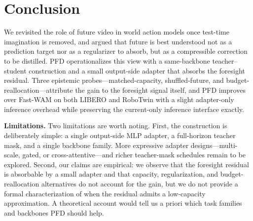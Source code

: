 \documentclass{article}
\begin{document}

\section{Conclusion}
\label{sec:conclusion}

We revisited the role of future video in world action models once test-time imagination is removed, and argued that future is best understood not as a prediction target nor as a regularizer to absorb, but as a compressible correction to be distilled. PFD operationalizes this view with a same-backbone teacher--student construction and a small output-side adapter that absorbs the foresight residual. Three epistemic probes---matched-capacity, shuffled-future, and budget-reallocation---attribute the gain to the foresight signal itself, and PFD improves over Fast-WAM on both LIBERO and RoboTwin with a slight adapter-only inference overhead while preserving the current-only inference interface exactly.

\noindent\textbf{Limitations.} Two limitations are worth noting. First, the construction is deliberately simple: a single output-side MLP adapter, a full-horizon teacher mask, and a single backbone family. More expressive adapter designs---multi-scale, gated, or cross-attentive---and richer teacher-mask schedules remain to be explored. Second, our claims are empirical: we observe that the foresight residual is absorbable by a small adapter and that capacity, regularization, and budget-reallocation alternatives do not account for the gain, but we do not provide a formal characterization of when the residual admits a low-capacity approximation. A theoretical account would tell us a priori which task families and backbones PFD should help.





\end{document}
